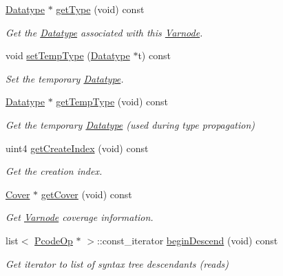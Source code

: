 \begin{DoxyCompactItemize}
\mbox{\hyperlink{class_datatype}{Datatype}} $\ast$ \mbox{\hyperlink{class_varnode_a8985a121184a10d08f28049cde4b2ff4}{get\+Type}} (void) const
\begin{DoxyCompactList}\small\item\em Get the \mbox{\hyperlink{class_datatype}{Datatype}} associated with this \mbox{\hyperlink{class_varnode}{Varnode}}. \end{DoxyCompactList}\item 
void \mbox{\hyperlink{class_varnode_a943c99fe7f3c62792570e35c0c205422}{set\+Temp\+Type}} (\mbox{\hyperlink{class_datatype}{Datatype}} $\ast$t) const
\begin{DoxyCompactList}\small\item\em Set the temporary \mbox{\hyperlink{class_datatype}{Datatype}}. \end{DoxyCompactList}\item 
\mbox{\hyperlink{class_datatype}{Datatype}} $\ast$ \mbox{\hyperlink{class_varnode_aadb6aff446d9948f49b204d2dc668261}{get\+Temp\+Type}} (void) const
\begin{DoxyCompactList}\small\item\em Get the temporary \mbox{\hyperlink{class_datatype}{Datatype}} (used during type propagation) \end{DoxyCompactList}\item 
uint4 \mbox{\hyperlink{class_varnode_a992373a5e7140d1af736526c0ecfa548}{get\+Create\+Index}} (void) const
\begin{DoxyCompactList}\small\item\em Get the creation index. \end{DoxyCompactList}\item 
\mbox{\hyperlink{class_cover}{Cover}} $\ast$ \mbox{\hyperlink{class_varnode_a0e03046ed77ca6463d0ff427f08acf7b}{get\+Cover}} (void) const
\begin{DoxyCompactList}\small\item\em Get \mbox{\hyperlink{class_varnode}{Varnode}} coverage information. \end{DoxyCompactList}\item 
list$<$ \mbox{\hyperlink{class_pcode_op}{Pcode\+Op}} $\ast$ $>$\+::const\+\_\+iterator \mbox{\hyperlink{class_varnode_a9a3b5ce1f30367b6652321fda08d25cb}{begin\+Descend}} (void) const
\begin{DoxyCompactList}\small\item\em Get iterator to list of syntax tree descendants (reads) \end{DoxyCompactList}\item 

\end{DoxyCompactItemize}
